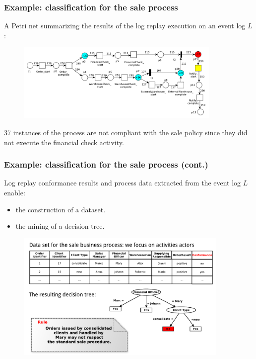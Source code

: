 \documentclass[10pt]{beamer}
\begin{document}
\begin{frame}
\frametitle{Example: classification for the sale process}
A Petri net summarizing the results of the log replay execution on an event log $L$:
\begin{figure}
\includegraphics[width=280pt]{./item/Sales_PN_resultMod.pdf}
\end{figure}
37 instances of the process are not compliant with the sale policy since they did not execute the financial check
activity.
\end{frame}

\begin{frame}
\frametitle{Example: classification for the sale process (cont.)}
Log replay conformance results and process data extracted from the event log $L$ enable:
\begin{itemize}
\item the construction of a dataset.
\item the mining of a decision tree.
\end{itemize}
\begin{figure}
\includegraphics[width=290pt]{./item/casestudy.pdf}
\end{figure}

\end{frame}
\end{document}
